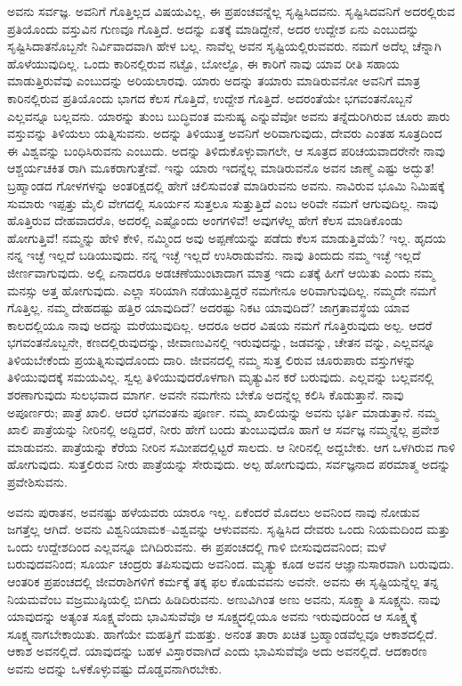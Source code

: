 ಅವನು ಸರ್ವಜ್ಞ. ಅವನಿಗೆ ಗೊತ್ತಿಲ್ಲದ ವಿಷಯವಿಲ್ಲ, ಈ ಪ್ರಪಂಚವನ್ನೆಲ್ಲ ಸೃಷ್ಟಿಸಿದವನು. ಸೃಷ್ಟಿಸಿದವನಿಗೆ ಅದರಲ್ಲಿರುವ ಪ್ರತಿಯೊಂದು ವಸ್ತುವಿನ ಗುಣವೂ ಗೊತ್ತಿದೆ. ಅದನ್ನು ಏತಕ್ಕೆ ಮಾಡಿದ್ದೇನೆ, ಅದರ ಉದ್ದೇಶ ಏನು ಎಂಬುದನ್ನು ಸೃಷ್ಟಿಸಿದಾತನೊಬ್ಬನೇ ನಿರ್ವಿವಾದವಾಗಿ ಹೇಳ ಬಲ್ಲ. ನಾವೆಲ್ಲ ಅವನ ಸೃಷ್ಟಿಯಲ್ಲಿರುವವರು. ನಮಗೆ ಅದೆಲ್ಲ ಚೆನ್ನಾಗಿ ಹೊಳೆಯುವುದಿಲ್ಲ. ಒಂದು ಕಾರಿನಲ್ಲಿರುವ ನಟ್ಟೊ, ಬೋಲ್ಟೊ, ಈ ಕಾರಿಗೆ ನಾವು ಯಾವ ರೀತಿ ಸಹಾಯ ಮಾಡುತ್ತಿರುವೆವು ಎಂಬುದನ್ನು ಅರಿಯಲಾರವು. ಯಾರು ಅದನ್ನು ತಯಾರು ಮಾಡಿರುವನೋ ಅವನಿಗೆ ಮಾತ್ರ ಕಾರಿನಲ್ಲಿರುವ ಪ್ರತಿಯೊಂದು ಭಾಗದ ಕೆಲಸ ಗೊತ್ತಿದೆ, ಉದ್ದೇಶ ಗೊತ್ತಿದೆ. ಅದರಂತೆಯೇ ಭಗವಂತನೊಬ್ಬನೆ ಎಲ್ಲವನ್ನೂ ಬಲ್ಲವನು. ಯಾರನ್ನು ತುಂಬ ಬುದ್ಧಿವಂತ ಮನುಷ್ಯ ಎನ್ನುವೆವೋ ಅವನು ತನ್ನೆದುರಿಗಿರುವ ಚೂರು ಪಾರು ವಸ್ತುವನ್ನು ತಿಳಿಯಲು ಯತ್ನಿಸುವನು. ಅದನ್ನು ತಿಳಿಯುತ್ತ ಅವನಿಗೆ ಅರಿವಾಗುವುದು, ದೇವರು ಎಂತಹ ಸೂತ್ರದಿಂದ ಈ ವಿಶ್ವವನ್ನು ಬಂಧಿಸಿರುವನು ಎಂಬುದು. ಅದನ್ನು ತಿಳಿದುಕೊಳ್ಳುವಾಗಲೇ, ಆ ಸೂತ್ರದ ಪರಿಚಯವಾದರೇನೇ ನಾವು ಆಶ್ಚರ್ಯಚಕಿತ ರಾಗಿ ಮೂಕರಾಗುತ್ತೇವೆ. ಇನ್ನು ಯಾರು ಇದನ್ನೆಲ್ಲ ಮಾಡಿರುವನೊ ಅವನ ಜಾಣ್ಮೆ ಎಷ್ಟು ಅದ್ಭುತ! ಬ್ರಹ್ಮಾಂಡದ ಗೋಳಗಳನ್ನು ಅಂತರಿಕ್ಷದಲ್ಲಿ ಹೇಗೆ ಚಲಿಸುವಂತೆ ಮಾಡಿರುವನು ಅವನು. ನಾವಿರುವ ಭೂಮಿ ನಿಮಿಷಕ್ಕೆ ಸುಮಾರು ಇಪ್ಪತ್ತು ಮೈಲಿ ವೇಗದಲ್ಲಿ ಸೂರ್ಯನ ಸುತ್ತಲೂ ಸುತ್ತುತ್ತಿದೆ ಎಂಬ ಅರಿವೇ ನಮಗೆ ಆಗುವುದಿಲ್ಲ. ನಾವು ಹೊತ್ತಿರುವ ದೇಹವಾದರೊ, ಅದರಲ್ಲಿ ಎಷ್ಟೊಂದು ಅಂಗಗಳಿವೆ! ಅವುಗಳೆಲ್ಲ ಹೇಗೆ ಕೆಲಸ ಮಾಡಿಕೊಂಡು ಹೋಗುತ್ತಿವೆ! ನಮ್ಮನ್ನು ಹೇಳಿ ಕೇಳಿ, ನಮ್ಮಿಂದ ಅವು ಅಪ್ಪಣೆಯನ್ನು ಪಡೆದು ಕೆಲಸ ಮಾಡುತ್ತಿವೆಯೆ? ಇಲ್ಲ. ಹೃದಯ ನನ್ನ ಇಚ್ಛೆ ಇಲ್ಲದೆ ಬಡಿಯುವುದು. ನನ್ನ ಇಚ್ಛೆ ಇಲ್ಲದೆ ಉಸಿರಾಡುವೆನು. ನಾವು ತಿಂದುದು ನಮ್ಮ ಇಚ್ಛೆ ಇಲ್ಲದೆ ಜೀರ್ಣವಾಗುವುದು. ಅಲ್ಲಿ ಏನಾದರೂ ಅಡಚಣೆಯುಂಟಾದಾಗ ಮಾತ್ರ ಇದು ಏತಕ್ಕೆ ಹೀಗೆ ಆಯಿತು ಎಂದು ನಮ್ಮ ಮನಸ್ಸು ಅತ್ತ ಹೋಗುವುದು. ಎಲ್ಲಾ ಸರಿಯಾಗಿ ನಡೆಯುತ್ತಿದ್ದರೆ ನಮಗೇನೂ ಅರಿವಾಗುವುದಿಲ್ಲ. ನಮ್ಮದೇ ನಮಗೆ ಗೊತ್ತಿಲ್ಲ. ನಮ್ಮ ದೇಹದಷ್ಟು ಹತ್ತಿರ ಯಾವುದಿದೆ? ಅದರಷ್ಟು ನಿಕಟ ಯಾವುದಿದೆ? ಜಾಗ್ರತಾವಸ್ಥೆಯ ಯಾವ ಕಾಲದಲ್ಲಿಯೂ ನಾವು ಅದನ್ನು ಮರೆಯುವುದಿಲ್ಲ. ಆದರೂ ಅದರ ವಿಷಯ ನಮಗೆ ಗೊತ್ತಿರುವುದು ಅಲ್ಪ. ಆದರೆ ಭಗವಂತನೊಬ್ಬನೇ, ಕಣದಲ್ಲಿರುವುದನ್ನು, ಜೀವಾಣುವಿನಲ್ಲಿ ಇರುವುದನ್ನು, ಜಡವನ್ನು, ಚೇತನ ವನ್ನು, ಎಲ್ಲವನ್ನೂ ತಿಳಿಯಬೇಕೆಂದು ಪ್ರಯತ್ನಿಸುವುದೊಂದು ದಾರಿ. ಜೀವನದಲ್ಲಿ ನಮ್ಮ ಸುತ್ತ ಲಿರುವ ಚೂರುಪಾರು ವಸ್ತುಗಳನ್ನು ತಿಳಿಯುವುದಕ್ಕೆ ಸಮಯವಿಲ್ಲ. ಸ್ವಲ್ಪ ತಿಳಿಯುವುದರೊಳಗಾಗಿ ಮೃತ್ಯುವಿನ ಕರೆ ಬರುವುದು. ಎಲ್ಲವನ್ನು ಬಲ್ಲವನಲ್ಲಿ ಶರಣಾಗುವುದು ಸುಲಭವಾದ ಮಾರ್ಗ. ಅವನೇ ನಮಗೇನು ಬೇಕೊ ಅದನ್ನೆಲ್ಲ ಕಲಿಸಿ ಕೊಡುತ್ತಾನೆ. ನಾವು ಅಪೂರ್ಣರು; ಪಾತ್ರೆ ಖಾಲಿ. ಆದರೆ ಭಗವಂತನು ಪೂರ್ಣ. ನಮ್ಮ ಖಾಲಿಯನ್ನು ಅವನು ಭರ್ತಿ ಮಾಡುತ್ತಾನೆ. ನಮ್ಮ ಖಾಲಿ ಪಾತ್ರೆಯನ್ನು ನೀರಿನಲ್ಲಿ ಅದ್ದಿದರೆ, ನೀರು ಹೇಗೆ ಬಂದು ತುಂಬುವುದೊ ಹಾಗೆ ಆ ಸರ್ವಜ್ಞ ನಮ್ಮನ್ನೆಲ್ಲ ಪ್ರವೇಶ ಮಾಡುವನು. ಪಾತ್ರೆಯನ್ನು ಕೆರೆಯ ನೀರಿನ ಸಮೀಪದಲ್ಲಿಟ್ಟರೆ ಸಾಲದು. ಆ ನೀರಿನಲ್ಲಿ ಅದ್ದಬೇಕು. ಆಗ ಒಳಗಿರುವ ಗಾಳಿ ಹೋಗುವುದು. ಸುತ್ತಲಿರುವ ನೀರು ಪಾತ್ರೆಯನ್ನು ಸೇರುವುದು. ಅಲ್ಪ ಹೋಗುವುದು, ಸರ್ವಜ್ಞನಾದ ಪರಮಾತ್ಮ ಅದನ್ನು ಪ್ರವೇಶಿಸುವನು.

ಅವನು ಪುರಾತನ, ಅವನಷ್ಟು ಹಳೆಯವರು ಯಾರೂ ಇಲ್ಲ. ಏಕೆಂದರೆ ಮೊದಲು ಅವನಿಂದ ನಾವು ನೋಡುವ ಜಗತ್ತೆಲ್ಲ ಆಗಿದೆ. ಅವನು ವಿಶ್ವನಿಯಾಮಕ–ವಿಶ್ವವನ್ನು ಆಳುವವನು. ಸೃಷ್ಟಿಸಿದ ದೇವರು ಒಂದು ನಿಯಮದಿಂದ ಮತ್ತು ಒಂದು ಉದ್ದೇಶದಿಂದ ಎಲ್ಲವನ್ನೂ ಬಿಗಿದಿರುವನು. ಈ ಪ್ರಪಂಚದಲ್ಲಿ ಗಾಳಿ ಬೀಸುವುದವನಿಂದ; ಮಳೆ ಬರುವುದವನಿಂದ; ಸೂರ್ಯ ಚಂದ್ರರು ತಪಿಸುವುದು ಅವನಿಂದ. ಮೃತ್ಯು ಕೂಡ ಅವನ ಆಜ್ಞಾನುಸಾರವಾಗಿ ಬರುವುದು. ಆಂತರಿಕ ಪ್ರಪಂಚದಲ್ಲಿ ಜೀವರಾಶಿಗಳಿಗೆ ಕರ್ಮಕ್ಕೆ ತಕ್ಕ ಫಲ ಕೊಡುವವನು ಅವನೇ. ಅವನು ಈ ಸೃಷ್ಟಿಯನ್ನೆಲ್ಲ ತನ್ನ ನಿಯಮವೆಂಬ ವಜ್ರಮುಷ್ಠಿಯಲ್ಲಿ ಬಿಗಿದು ಹಿಡಿದಿರುವನು. ಅಣುವಿಗಿಂತ ಅಣು ಅವನು, ಸೂಕ್ಷ್ಮಾತಿ ಸೂಕ್ಷ್ಮನು. ನಾವು ಯಾವುದನ್ನು ಅತ್ಯಂತ ಸೂಕ್ಷ್ಮವೆಂದು ಭಾವಿಸುವೆವೊ ಆ ಸೂಕ್ಷ್ಮದಲ್ಲಿಯೂ ಅವನು ಇರುವುದರಿಂದ ಆ ಸೂಕ್ಷ್ಮಕ್ಕೆ ಸೂಕ್ಷ್ಮನಾಗಬೇಕಾಯಿತು. ಹಾಗೆಯೇ ಮಹತ್ತಿಗೆ ಮಹತ್ತು. ಅನಂತ ತಾರಾ ಖಚಿತ ಬ್ರಹ್ಮಾಂಡವೆಲ್ಲವೂ ಆಕಾಶದಲ್ಲಿದೆ. ಆಕಾಶ ಅವನಲ್ಲಿದೆ. ಯಾವುದನ್ನು ಬಹಳ ವಿಸ್ತಾರವಾಗಿದೆ ಎಂದು ಭಾವಿಸುವೆವೊ ಅದು ಅವನಲ್ಲಿದೆ. ಆದಕಾರಣ ಅವನು ಅದನ್ನು ಒಳಕೊಳ್ಳುವಷ್ಟು ದೊಡ್ಡವನಾಗಿರಬೇಕು.

